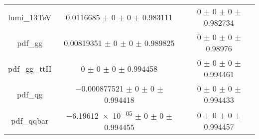 \begin{table}
\begin{tabular}{ccc}
lumi\_13TeV & \num{0.0116685} $\pm$ \num{0} $\pm$ \num{0} $\pm$ \num{0.983111} & \num{0} $\pm$ \num{0} $\pm$ \num{0} $\pm$ \num{0.982734}\\
pdf\_gg & \num{0.00819351} $\pm$ \num{0} $\pm$ \num{0} $\pm$ \num{0.989825} & \num{0} $\pm$ \num{0} $\pm$ \num{0} $\pm$ \num{0.98976}\\
pdf\_gg\_ttH & \num{0} $\pm$ \num{0} $\pm$ \num{0} $\pm$ \num{0.994458} & \num{0} $\pm$ \num{0} $\pm$ \num{0} $\pm$ \num{0.994461}\\
pdf\_qg & \num{-0.000877521} $\pm$ \num{0} $\pm$ \num{0} $\pm$ \num{0.994418} & \num{0} $\pm$ \num{0} $\pm$ \num{0} $\pm$ \num{0.994433}\\
pdf\_qqbar & \num{-6.19612e-05} $\pm$ \num{0} $\pm$ \num{0} $\pm$ \num{0.994455} & \num{0} $\pm$ \num{0} $\pm$ \num{0} $\pm$ \num{0.994457}\\
\bottomrule
\end{tabular}
\end{table}